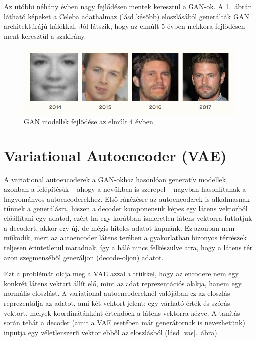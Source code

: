 Az utóbbi néhány évben nagy fejlődésen mentek keresztül a GAN-ok. A \ref{gan_progress}.~ábrán látható képeket a Celeba adathalmaz (lásd később) eloszlásából generálták GAN architektúrájú hálókkal. Jól látszik, hogy az elmúlt 5 évben mekkora fejlődésen ment keresztül a szakirány. 

\begin{figure}[h!]
\begin{center}
  
  
	\begin{center}
	\includegraphics[width=\linewidth]{gan_progress.jpg}
	\end{center}
	
  \caption{GAN modellek fejlődése az elmúlt 4 évben}\label{gan_progress}
\end{center}
\end{figure}

\section{Variational Autoencoder (VAE)}

A variational autoencoderek a GAN-okhoz hasonlóan generatív modellek, azonban a felépítésük -- ahogy a nevükben is szerepel --  nagyban hasonlítanak a hagyományos autoencoderekhez.
Első ránézésre az autoencoderek is alkalmasnak tűnnek a generálásra, hiszen a decoder komponensük képes egy látens vektorból előállítani egy adatod, ezért ha egy korábban ismeretlen látens vektorra futtatjuk a decodert, akkor egy új, de mégis hiteles adatot kapnánk. Ez azonban nem működik, mert az autoencoder látens terében a gyakorlatban bizonyos térrészek teljesen érintetlenül maradnak, így a háló nincs felkészülve arra, hogy a látens tér azon szegmenséből generáljon (decode-oljon) adatot.

Ezt a problémát oldja meg a VAE azzal a trükkel, hogy az encodere nem egy konkrét látens vektort állít elő, mint az adat reprezentációs alakja, hanem egy normális eloszlást. A variational autoencodereknél valójában ez az eloszlás reprezentálja az adatot, ami két vektort jelent: egy várható érték és szórás vektort, melyek koordinátánként értendőek a látens vektorra nézve. A tanítás során tehát a decoder (amit a VAE esetében már generátornak is nevezhetünk) inputja egy véletlenszerű vektor ebből az eloszlásból (lásd \ref{vae}.~ábra).

